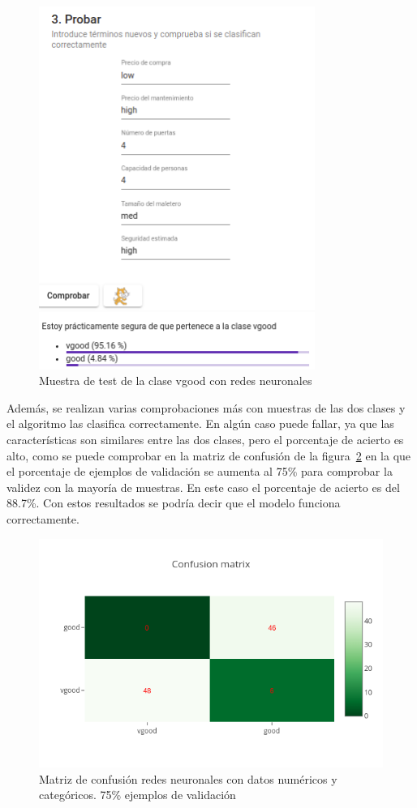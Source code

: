 \documentclass[a4paper, 12pt]{book}
\begin{document}
\begin{figure}
	\centering
	\includegraphics[width=9cm, keepaspectratio]{img/vgood_rn.png}
	\caption{Muestra de test de la clase vgood con redes neuronales} 	
	\label{fig:ejemplo21}
\end{figure}

Además, se realizan varias comprobaciones más con muestras de las dos clases y el algoritmo las clasifica correctamente. 
En algún caso puede fallar, ya que las características son similares entre las dos clases, pero el porcentaje de acierto es alto, como se puede comprobar en la matriz de confusión de la figura~\ref{fig:ejemplo22} en la que el porcentaje de ejemplos de validación se aumenta al 75\% para comprobar la validez con la mayoría de muestras. En este caso el porcentaje de acierto es del 88.7\%. Con estos resultados se podría decir que el modelo funciona correctamente.

\begin{figure}
	\centering
	\includegraphics[width=12cm, keepaspectratio]{img/cm_numycat_rn2.png}
	\caption{Matriz de confusión redes neuronales con datos numéricos y categóricos. 75\% ejemplos de validación} 	
	\label{fig:ejemplo22}
\end{figure}
\end{document}

